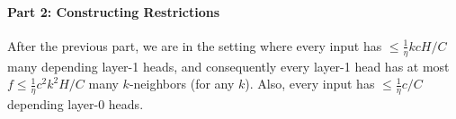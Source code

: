 \documentclass[11pt,a4paper]{article}
\begin{document}







\paragraph{Part 2: Constructing Restrictions}
After the previous part, we are in the setting where every input has $\leq \frac{1}{\eta}kcH/C$ many depending layer-1 heads, and consequently every layer-1 head has at most $f \leq \frac{1}{\eta}c^2k^2H/C$ many $k$-neighbors (for any $k$).
Also, every input has $\leq \frac{1}{\eta}c/C$ depending layer-0 heads.
\end{document}
